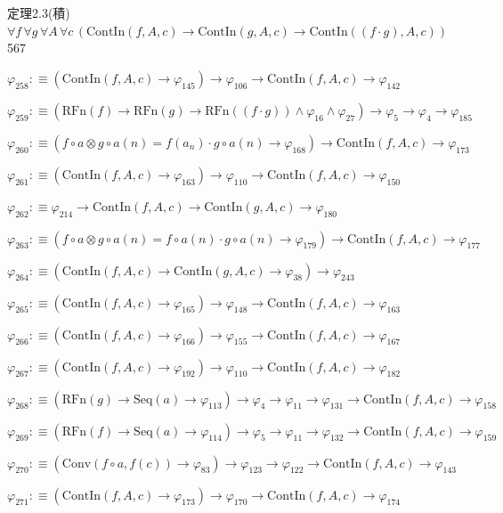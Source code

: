 \begin{fullproof}{定理2.3(積)}{$\forall f\,\forall g\,\forall A\,\forall c\,(\mathrm{ContIn}(f,A,c) \to \mathrm{ContIn}(g,A,c) \to \mathrm{ContIn}((f \cdot g),A,c))$}{567}
\begin{abbrevlist}
\item $\varphi_{258} :\equiv (\mathrm{ContIn}(f,A,c) \to \varphi_{145}) \to \varphi_{106} \to \mathrm{ContIn}(f,A,c) \to \varphi_{142}$
\item $\varphi_{259} :\equiv (\mathrm{RFn}(f) \to \mathrm{RFn}(g) \to \mathrm{RFn}((f \cdot g)) \land \varphi_{16} \land \varphi_{27}) \to \varphi_{5} \to \varphi_{4} \to \varphi_{185}$
\item $\varphi_{260} :\equiv (f \circ a \otimes g \circ a(n) = f(a_{n}) \cdot g \circ a(n) \to \varphi_{168}) \to \mathrm{ContIn}(f,A,c) \to \varphi_{173}$
\item $\varphi_{261} :\equiv (\mathrm{ContIn}(f,A,c) \to \varphi_{163}) \to \varphi_{110} \to \mathrm{ContIn}(f,A,c) \to \varphi_{150}$
\item $\varphi_{262} :\equiv \varphi_{214} \to \mathrm{ContIn}(f,A,c) \to \mathrm{ContIn}(g,A,c) \to \varphi_{180}$
\item $\varphi_{263} :\equiv (f \circ a \otimes g \circ a(n) = f \circ a(n) \cdot g \circ a(n) \to \varphi_{179}) \to \mathrm{ContIn}(f,A,c) \to \varphi_{177}$
\item $\varphi_{264} :\equiv (\mathrm{ContIn}(f,A,c) \to \mathrm{ContIn}(g,A,c) \to \varphi_{38}) \to \varphi_{243}$
\item $\varphi_{265} :\equiv (\mathrm{ContIn}(f,A,c) \to \varphi_{165}) \to \varphi_{148} \to \mathrm{ContIn}(f,A,c) \to \varphi_{163}$
\item $\varphi_{266} :\equiv (\mathrm{ContIn}(f,A,c) \to \varphi_{166}) \to \varphi_{155} \to \mathrm{ContIn}(f,A,c) \to \varphi_{167}$
\item $\varphi_{267} :\equiv (\mathrm{ContIn}(f,A,c) \to \varphi_{192}) \to \varphi_{110} \to \mathrm{ContIn}(f,A,c) \to \varphi_{182}$
\item $\varphi_{268} :\equiv (\mathrm{RFn}(g) \to \mathrm{Seq}(a) \to \varphi_{113}) \to \varphi_{4} \to \varphi_{11} \to \varphi_{131} \to \mathrm{ContIn}(f,A,c) \to \varphi_{158}$
\item $\varphi_{269} :\equiv (\mathrm{RFn}(f) \to \mathrm{Seq}(a) \to \varphi_{114}) \to \varphi_{5} \to \varphi_{11} \to \varphi_{132} \to \mathrm{ContIn}(f,A,c) \to \varphi_{159}$
\item $\varphi_{270} :\equiv (\mathrm{Conv}(f \circ a,f(c)) \to \varphi_{83}) \to \varphi_{123} \to \varphi_{122} \to \mathrm{ContIn}(f,A,c) \to \varphi_{143}$
\item $\varphi_{271} :\equiv (\mathrm{ContIn}(f,A,c) \to \varphi_{173}) \to \varphi_{170} \to \mathrm{ContIn}(f,A,c) \to \varphi_{174}$

\end{abbrevlist}
\end{fullproof}
